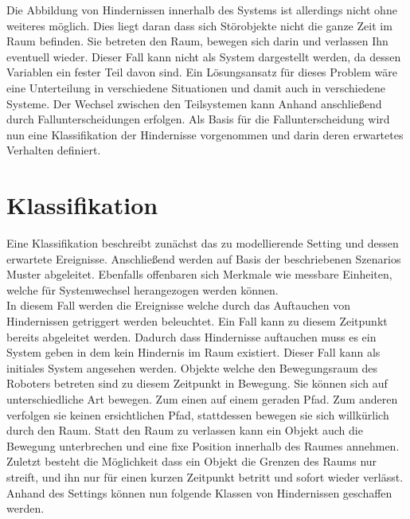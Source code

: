 Die Abbildung von Hindernissen innerhalb des Systems ist allerdings nicht ohne weiteres möglich. Dies liegt daran dass sich Störobjekte nicht die ganze Zeit im Raum befinden. Sie betreten den Raum, bewegen sich darin und verlassen Ihn eventuell wieder. Dieser Fall kann nicht als System dargestellt werden, da dessen Variablen ein fester Teil davon sind. Ein Lösungsansatz für dieses Problem wäre eine Unterteilung in verschiedene Situationen und damit auch in verschiedene Systeme. Der Wechsel zwischen den Teilsystemen kann Anhand anschließend durch Fallunterscheidungen erfolgen. Als Basis für die Fallunterscheidung wird nun eine Klassifikation der Hindernisse vorgenommen und darin deren erwartetes Verhalten definiert.

\section{Klassifikation}
Eine Klassifikation beschreibt zunächst das zu modellierende Setting und dessen erwartete Ereignisse. Anschließend werden auf Basis der beschriebenen Szenarios Muster abgeleitet. Ebenfalls offenbaren sich Merkmale wie messbare Einheiten, welche für Systemwechsel herangezogen werden können.\\
In diesem Fall werden die Ereignisse welche durch das Auftauchen von Hindernissen getriggert werden beleuchtet. Ein Fall kann zu diesem Zeitpunkt bereits abgeleitet werden. Dadurch dass Hindernisse auftauchen muss es ein System geben in dem kein Hindernis im Raum existiert. Dieser Fall kann als initiales System angesehen werden. Objekte welche den Bewegungsraum des Roboters betreten sind zu diesem Zeitpunkt in Bewegung. Sie können sich auf unterschiedliche Art bewegen. Zum einen auf einem geraden Pfad. Zum anderen verfolgen sie keinen ersichtlichen Pfad, stattdessen bewegen sie sich willkürlich durch den Raum. Statt den Raum zu verlassen kann ein Objekt auch die Bewegung unterbrechen und eine fixe Position innerhalb des Raumes annehmen. Zuletzt besteht die Möglichkeit dass ein Objekt die Grenzen des Raums nur streift, und ihn nur für einen kurzen Zeitpunkt betritt und sofort wieder verlässt.\\
Anhand des Settings können nun folgende Klassen von Hindernissen geschaffen werden.


